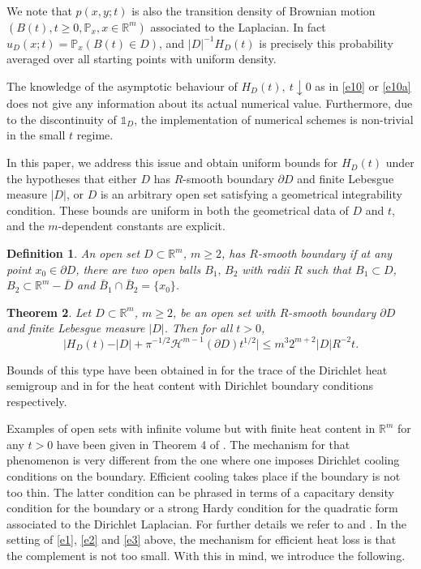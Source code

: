 \documentclass[a4paper,9pt]{amsart}
\newtheorem{theorem}{Theorem}
\newtheorem{definition}[theorem]{Definition}
\begin{document}
We note that $p(x,y;t)$ is also the transition density of Brownian
motion $(B(t), t\ge 0, \mathbb{P}_x,x\in {\mathbb{R}}^m)$ associated to the
Laplacian. In fact $u_D(x;t)=\mathbb{P}_x(B(t)\in D)$, and
$|D|^{-1}H_D(t)$ is precisely this probability averaged over all
starting points with uniform density.

The knowledge of the asymptotic behaviour of $H_D(t),\ t\downarrow
0$ as in \eqref{e10} or \eqref{e10a} does not give any information
about its actual numerical value. Furthermore, due to the
discontinuity of $\mathds{1}_{D}$, the implementation of numerical
schemes is non-trivial in the small $t$ regime.

In this paper, we address this issue and obtain uniform bounds for
$H_D(t)$ under the hypotheses that either $D$ has $R$-smooth
boundary $\partial D$ and finite Lebesgue measure $\vert D \vert$,
or $D$ is an arbitrary open set satisfying a geometrical
integrability condition. These bounds are uniform in both the
geometrical data of $D$ and $t$, and the $m$-dependent constants
are explicit.
\begin{definition}
An open set $D \subset \mathbb{R}^{m}$, $m\geq 2$, has $R$-smooth
boundary if at any point $x_{0} \in \partial D$, there are two
open balls $B_{1}, \, B_{2}$ with radii $R$ such that $B_{1} \subset D$, $B_{2}
\subset \mathbb{R}^{m}-\bar{D}$ and $\bar{B}_{1} \cap
\bar{B}_{2}=\{x_{0}\}$.
\end{definition}

\begin{theorem}\label{T:main}
Let $D \subset \mathbb{R}^{m}$, $m \geq 2$, be an open set with
$R$-smooth boundary $\partial D$ and finite Lebesgue measure
$\vert D \vert$. Then for all $t>0$,
\[\bigg\vert H_{D}(t) - \vert D \vert + \pi^{-1/2}\mathcal{H}^{m-1}(\partial D)t^{1/2}\bigg\vert \leq
m^{3}2^{m+2}\vert D \vert R^{-2}t.\]
\end{theorem}
Bounds of this type have been obtained in \cite{mvdB87} for the
trace of the Dirichlet heat semigroup and in \cite{vdBD89} for the
heat content with Dirichlet boundary conditions respectively.

Examples of open sets with infinite volume but with finite heat
content in ${\mathbb{R}}^m$ for any $t>0$ have been given in Theorem 4 of
\cite{mvdB13}. The mechanism for that phenomenon is very different
from the one where one imposes Dirichlet cooling conditions on the
boundary.  Efficient cooling takes place if the boundary is not
too thin. The latter condition can be phrased in terms of a
capacitary density condition for the boundary or a strong Hardy
condition for the quadratic form associated to the Dirichlet
Laplacian. For further details we refer to
\cite{vdB05,vdB07,vdBG04} and \cite{vdBGGK}. In the setting of
\eqref{e1}, \eqref{e2} and \eqref{e3} above, the mechanism for
efficient heat loss is that the complement is not too small. With
this in mind, we introduce the following.
\end{document}

